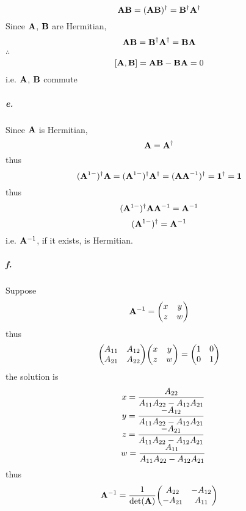 \documentclass[a4paper]{article}
\newcommand{\subex}[1]{\subparagraph{#1}}
\newcommand{\iden}{{\large \bm{1}}}
\numberwithin{equation}{subsection}
\begin{document}
\begin{equation}\label{key}
\vb{A}\vb{B} = (\vb{A}\vb{B})^\dagger = \vb{B}^\dagger \vb{A}^\dagger
\end{equation}
Since $ \vb{A} $, $ \vb{B} $ are Hermitian,
\begin{equation}\label{key}
\vb{A}\vb{B} = \vb{B}^\dagger \vb{A}^\dagger = \vb{B}\vb{A}
\end{equation}
$ \therefore $
\begin{equation}\label{key}
[\vb{A}, \vb{B}] = \vb{A}\vb{B} - \vb{B}\vb{A} = 0
\end{equation}
i.e. $ \vb{A} $, $ \vb{B} $ commute
\subex{e.}
Since $ \vb{A} $ is Hermitian,
\begin{equation}\label{key}
\vb{A} = \vb{A}^\dagger
\end{equation}
thus
\begin{equation}\label{key}
(\vb{A}^{1-})^\dagger \vb{A} = (\vb{A}^{1-})^\dagger \vb{A}^\dagger = (\vb{A}\vb{A}^{-1})^\dagger = \iden^\dagger = \iden
\end{equation}
thus
\begin{equation}\label{key}
(\vb{A}^{1-})^\dagger \vb{A} \vb{A}^{-1} = \vb{A}^{-1}
\end{equation}
\begin{equation}\label{key}
(\vb{A}^{1-})^\dagger = \vb{A}^{-1}
\end{equation}
i.e. $ \vb{A}^{-1} $, if it exists, is Hermitian.
\subex{f.}
Suppose
\begin{equation}\label{key}
\vb{A}^{-1} = \mqty(x & y\\z & w)
\end{equation}
thus
\begin{equation}\label{key}
\mqty(A_{11} & A_{12}\\A_{21} & A_{22})\mqty(x & y\\z & w) = \mqty(1 & 0\\0 & 1)
\end{equation}
the solution is
\begin{equation}\label{key}
\mqty{
	&x = \dfrac{A_{22}}{A_{11}A_{22} - A_{12}A_{21}}\\
	&y = \dfrac{-A_{12}}{A_{11}A_{22} - A_{12}A_{21}}\\
	&z = \dfrac{-A_{21}}{A_{11}A_{22} - A_{12}A_{21}}\\
	&w = \dfrac{A_{11}}{A_{11}A_{22} - A_{12}A_{21}}\\ 
}
\end{equation}
thus
\begin{equation}\label{key}
\vb{A}^{-1} = \dfrac{1}{\det(\vb{A})} \mqty(A_{22} & -A_{12}\\ -A_{21} & A_{11})
\end{equation}
\end{document}
